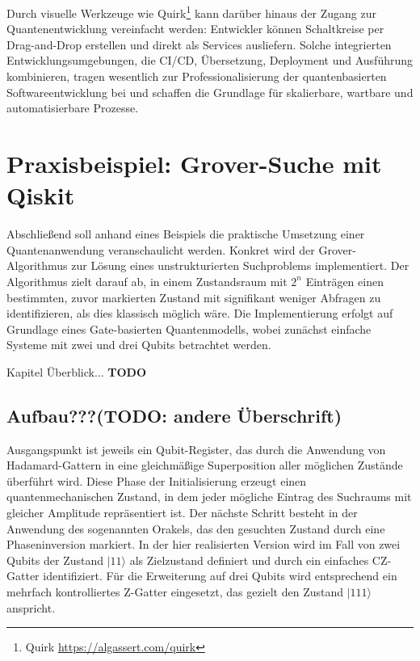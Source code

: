 Durch visuelle Werkzeuge wie Quirk\footnote{Quirk \url{https://algassert.com/quirk}} kann darüber hinaus der Zugang zur Quantenentwicklung vereinfacht werden: Entwickler können Schaltkreise per Drag-and-Drop erstellen und direkt als Services ausliefern. Solche integrierten Entwicklungsumgebungen, die CI/CD, Übersetzung, Deployment und Ausführung kombinieren, tragen wesentlich zur Professionalisierung der quantenbasierten Softwareentwicklung bei und schaffen die Grundlage für skalierbare, wartbare und automatisierbare Prozesse. \autocite{romero-alvarez_qcraft_2025}

\section{Praxisbeispiel: Grover-Suche mit Qiskit}
\label{sec:practical-example}

Abschließend soll anhand eines Beispiels die praktische Umsetzung einer Quantenanwendung veranschaulicht werden. Konkret wird der Grover-Algorithmus zur Lösung eines unstrukturierten Suchproblems implementiert. Der Algorithmus zielt darauf ab, in einem Zustandsraum mit $2^n$ Einträgen einen bestimmten, zuvor markierten Zustand mit signifikant weniger Abfragen zu identifizieren, als dies klassisch möglich wäre. Die Implementierung erfolgt auf Grundlage eines Gate-basierten Quantenmodells, wobei zunächst einfache Systeme mit zwei und drei Qubits betrachtet werden.

Kapitel Überblick... \textbf{TODO}

\subsection{Aufbau???(TODO: andere Überschrift)}

Ausgangspunkt ist jeweils ein Qubit-Register, das durch die Anwendung von Hadamard-Gattern in eine gleichmäßige Superposition aller möglichen Zustände überführt wird. Diese Phase der Initialisierung erzeugt einen quantenmechanischen Zustand, in dem jeder mögliche Eintrag des Suchraums mit gleicher Amplitude repräsentiert ist. Der nächste Schritt besteht in der Anwendung des sogenannten Orakels, das den gesuchten Zustand durch eine Phaseninversion markiert. In der hier realisierten Version wird im Fall von zwei Qubits der Zustand $|11\rangle$ als Zielzustand definiert und durch ein einfaches CZ-Gatter identifiziert. Für die Erweiterung auf drei Qubits wird entsprechend ein mehrfach kontrolliertes Z-Gatter eingesetzt, das gezielt den Zustand $|111\rangle$ anspricht.

